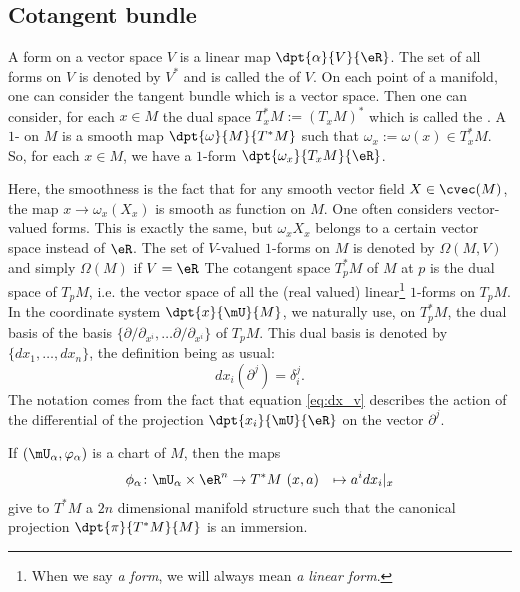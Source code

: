 \subsection{Cotangent bundle}

A form on a vector space $V$ is a linear map $\dpt{\alpha}{V}{\eR}$. The set of all forms on $V$ is denoted by $V^*$ and is called the  of $V$. On each point of a manifold, one can consider the tangent bundle which is a vector space. Then one can consider, for each $x\in M$ the dual space $T^*_xM:=(T_xM)^*$ which is called the . A $1$- on $M$ is a smooth map $\dpt{\omega}{M}{T^*M}$ such that $\omega_x:=\omega(x)\in T^*_xM$. So, for each $x\in M$, we have a $1$-form $\dpt{\omega_x}{T_xM}{\eR}$.

Here, the smoothness is the fact that for any smooth vector field $X\in\cvec(M)$, the map $x\to\omega_x(X_x)$ is smooth as function on $M$. One often considers vector-valued forms. This is exactly the same, but $\omega_xX_x$ belongs to a certain vector space instead of $\eR$. The set of $V$-valued $1$-forms on $M$ is denoted by $\Omega(M,V)$  and simply $\Omega(M)$ if $V=\eR$
The cotangent space $T^*_pM$ of $M$ at $p$ is the dual space of $T_pM$, i.e. the vector space of all the (real valued) linear\footnote{When we say \emph{a form}, we will always mean \emph{a linear form}.} $1$-forms on $T_pM$. In the coordinate system $\dpt{x}{\mU}{M}$, we naturally use, on $T^*_pM$, the dual basis of the basis $\{\partial/\partial_{x^i},\ldots\partial/\partial_{x^i}\}$ of $T_pM$. This dual basis is denoted by $\{dx_1,\ldots,dx_n\}$, the definition being as usual:
\begin{equation}\label{eq:dx_v}
  dx_i(\partial^j)=\delta^j_i.
\end{equation}
The notation comes from the fact that equation \eqref{eq:dx_v} describes the action of the differential of the projection $\dpt{x_i}{\mU}{\eR}$ on the vector $\partial^j$.

If $(\mU_{\alpha},\varphi_{\alpha})$ is a chart of $M$, then the maps
		\begin{equation}
		\begin{aligned}
			\phi_{\alpha} \colon \mU_{\alpha}\times\eR^n &\to T^*M\
			(x,a)&\mapsto a^idx_i|_x
		\end{aligned}
	\end{equation}
give to $T^*M$ a $2n$ dimensional manifold structure such that the canonical projection $\dpt{\pi}{T^*M}{M}$ is an immersion.

